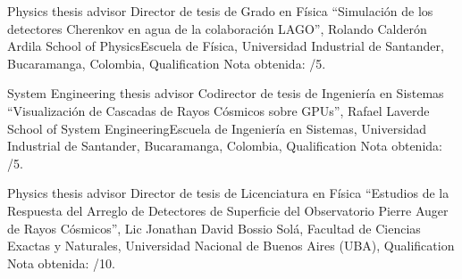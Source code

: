\ifeng
Physics thesis advisor
 \else
Director de tesis de Grado en Física
 \fi
``Simulación de los detectores Cherenkov en agua de la colaboración LAGO'', Rolando Calderón Ardila \at \ifeng School of Physics\else Escuela de Física\fi, Universidad Industrial de Santander, Bucaramanga, Colombia, \ifeng Qualification \else Nota obtenida: /5. 

\ifeng
System Engineering thesis advisor
 \else
Codirector de tesis de Ingeniería en Sistemas
 \fi
``Visualización de Cascadas de Rayos Cósmicos sobre GPUs'', Rafael Laverde \at \ifeng School of System Engineering\else Escuela de Ingeniería en Sistemas\fi, Universidad Industrial de Santander, Bucaramanga, Colombia, \ifeng Qualification \else Nota obtenida: /5.

\ifeng
Physics thesis advisor
 \else
Director de tesis de Licenciatura en Física
 \fi
``Estudios de la Respuesta del Arreglo de Detectores de Superficie del Observatorio Pierre Auger de Rayos Cósmicos'', Lic Jonathan David Bossio Solá, \at Facultad de Ciencias Exactas y Naturales, Universidad Nacional de Buenos Aires (UBA), \ifeng Qualification \else Nota obtenida: /10.
